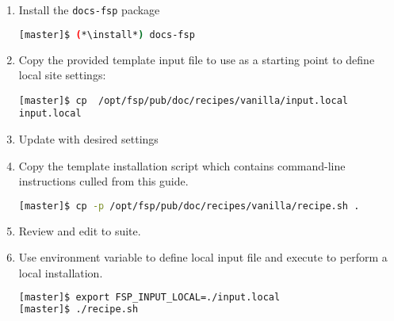 \begin{enumerate}
\item Install the \texttt{docs-fsp} package

\begin{lstlisting}[language=bash,keywords={}]
[master]$ (*\install*) docs-fsp
\end{lstlisting}

\item Copy the provided template input file to use as a starting point to
  define local site settings:
\begin{lstlisting}
[master]$ cp  /opt/fsp/pub/doc/recipes/vanilla/input.local input.local
\end{lstlisting}

\item Update  with desired settings

\item Copy the template installation script which contains command-line
  instructions culled from this guide.

\begin{lstlisting}[language=bash,keywords={}]
[master]$ cp -p /opt/fsp/pub/doc/recipes/vanilla/recipe.sh .
\end{lstlisting}

\item Review and edit  to suite.

\item Use environment variable to define local input file and execute
   to perform a local installation.

\begin{lstlisting}[language=bash,keywords={}]
[master]$ export FSP_INPUT_LOCAL=./input.local
[master]$ ./recipe.sh
\end{lstlisting}
\end{enumerate}



